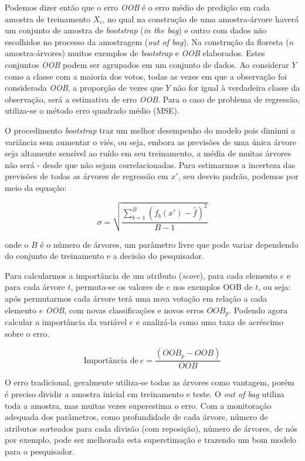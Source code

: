 \documentclass[
  openany]{book}
\begin{document}
Podemos dizer então que o erro \emph{OOB} é o erro médio de predição em cada amostra de treinamento \(X_i\), no qual na construção de uma amostra-árvore haverá um conjunto de amostra de \emph{bootstrap} (\emph{in the bag}) e outro com dados não escolhidos no processo da amostragem (\emph{out of bag}). Na construção da floresta (\(n\) amostra-árvores) muitos exemplos de \emph{bootstrap} e \emph{OOB} elaborados. Estes conjuntos \emph{OOB} podem ser agrupados em um conjunto de dados. Ao considerar \(Y\) como a classe com a maioria dos votos, todas as vezes em que a observação foi considerada \emph{OOB}, a proporção de vezes que \(Y\) não for igual à verdadeira classe da observação, será a estimativa de erro \emph{OOB}. Para o caso de problema de regressão, utiliza-se o método erro quadrado médio (MSE).

O procedimento \emph{bootstrap} traz um melhor desempenho do modelo pois diminui a variância sem aumentar o viés, ou seja, embora as previsões de uma única árvore seja altamente sensível ao ruído em seu treinamento, a média de muitas árvores não será - desde que não sejam correlacionadas. Para estimarmos a incerteza das previsões de todas as árvores de regressão em \(x'\), seu desvio padrão, podemos por meio da equação:

\begin{equation}
\sigma = \sqrt{\frac{\sum^B_{b=1}(f_b(x')-\hat{f})^2}{B-1}}
\label{eq:desviorf}
\end{equation}

onde o \(B\) é o número de árvores, um parâmetro livre que pode variar dependendo do conjunto de treinamento e a decisão do pesquisador.

Para calcularmos a importância de um atributo (\emph{score}), para cada elemento \(e\) e para cada árvore \(t\), permuta-se os valores de \(e\) nos exemplos OOB de \(t\), ou seja: após permutarmos cada árvore terá uma nova votação em relação a cada elemento \(e\) \emph{OOB}, com novas classificações e novos erros \(OOB_p\). Podendo agora calcular a importância da variável \(e\) e analizá-la como uma taxa de acréscimo sobre o erro.

\begin{equation}
\mbox{Importância de} \ e = \frac{(OOB_p-OOB)}{OOB}
\label{eq:impc}
\end{equation}

O erro tradicional, geralmente utiliza-se todas as árvores como vantagem, porém é preciso dividir a amostra inicial em treinamento e teste. O \emph{out of bag} utiliza toda a amostra, mas muitas vezes superestima o erro. Com a monitoração adequada dos parâmetros, como profundidade de cada árvore, número de atributos sorteados para cada divisão (com reposição), número de árvores, de nós por exemplo, pode ser melhorada esta superstimação e trazendo um bom modelo para o pesquisador.
\end{document}
